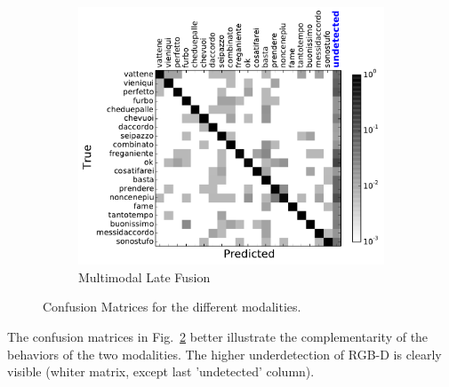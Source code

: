 \begin{figure}[t]
        ~ %
        \begin{subfigure}[c]{0.36\textwidth}
                \includegraphics[width=\textwidth]{images/cm/cm_combination}
\vspace*{-3mm}
                \caption{Multimodal Late Fusion}
                \label{fusion_cm}
        \end{subfigure}

  \caption{Confusion Matrices  for the different modalities.}
\label{fig:confusion_matrix}
\end{figure}

%
The confusion matrices in Fig.~\ref{fig:confusion_matrix} better illustrate the complementarity of the behaviors of the two modalities.
%
The higher underdetection of RGB-D is clearly visible (whiter matrix, except last 'undetected' column).
%

